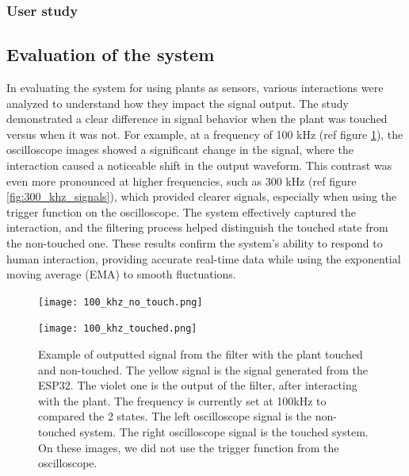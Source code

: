 \newpage
\subsubsection{User study}

\subsection{Evaluation of the system}

In evaluating the system for using plants as sensors, various interactions were analyzed to understand how they impact the signal output. The study demonstrated a clear difference in signal behavior when the plant was touched versus when it was not. For example, at a frequency of 100 kHz (ref figure \ref{fig:100_khz_signals}), the oscilloscope images showed a significant change in the signal, where the interaction caused a noticeable shift in the output waveform. This contrast was even more pronounced at higher frequencies, such as 300 kHz (ref figure \ref{fig:300_khz_signals}), which provided clearer signals, especially when using the trigger function on the oscilloscope. The system effectively captured the interaction, and the filtering process helped distinguish the touched state from the non-touched one. These results confirm the system's ability to respond to human interaction, providing accurate real-time data while using the exponential moving average (EMA) to smooth fluctuations.

\begin{figure}[h!]
    \centering
    \begin{minipage}{.5\textwidth}
      \centering
      \texttt{[image: 100\_khz\_no\_touch.png]}
      \label{fig:100_khz_no_touch}
    \end{minipage}%
    \begin{minipage}{.5\textwidth}
      \centering
      \texttt{[image: 100\_khz\_touched.png]}
      \label{fig:100_khz_touched}
    \end{minipage}
    \caption{Example of outputted signal from the filter with the plant touched and non-touched. The yellow signal is the signal generated from the ESP32. The violet one is the output of the filter, after interacting with the plant. The frequency is currently set at 100kHz to compared the 2 states. The left oscilloscope signal is the non-touched system. The right oscilloscope signal is the touched system. On these images, we did not use the trigger function from the oscilloscope.}
    \label{fig:100_khz_signals}
\end{figure}


